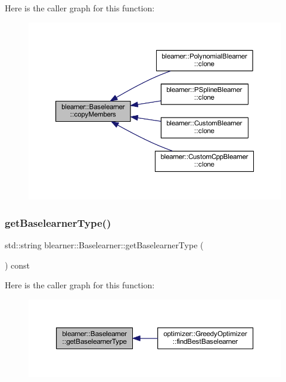 Here is the caller graph for this function\+:
\nopagebreak
\begin{figure}[H]
\begin{center}
\leavevmode
\includegraphics[width=350pt]{classblearner_1_1_baselearner_ae8f114ca7c497f03c80de5981c7f811d_icgraph}
\end{center}
\end{figure}
\mbox{\label{classblearner_1_1_baselearner_acec1a791f94eed39d2662c245e7f6b51}} 
\subsubsection{\texorpdfstring{get\+Baselearner\+Type()}{getBaselearnerType()}}
{\footnotesize\ttfamily std\+::string blearner\+::\+Baselearner\+::get\+Baselearner\+Type (\begin{DoxyParamCaption}{ }\end{DoxyParamCaption}) const}

Here is the caller graph for this function\+:
\nopagebreak
\begin{figure}[H]
\begin{center}
\leavevmode
\includegraphics[width=350pt]{classblearner_1_1_baselearner_acec1a791f94eed39d2662c245e7f6b51_icgraph}
\end{center}
\end{figure}
\mbox{\label{classblearner_1_1_baselearner_af3a360bb039447610e9928956384c05d}} 
